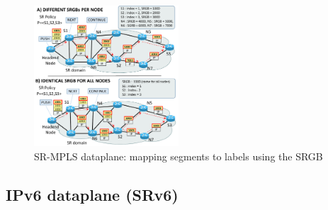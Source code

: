 \begin{figure}
    \centering
    \includegraphics[width=0.48\textwidth]{fig/srgb-mpls-ok.pdf}
    \caption{SR-MPLS dataplane: mapping segments to labels using the SRGB}
    \label{fig:mpls-dataplane}
    \vspace{-3ex}
\end{figure}


\subsection{IPv6 dataplane (SRv6)}
\label{sec:ipv6 dataplane}

